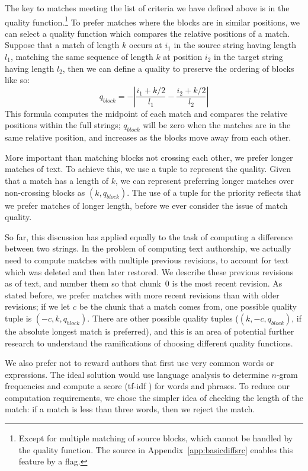 The key to matches meeting the list of criteria we have
defined above is in the quality function.\footnote{Except for
multiple matching of source blocks, which cannot be handled
by the quality
function.  The source in Appendix~\ref{app:basicdiffsrc}
enables this feature by a flag.}
To prefer matches where the blocks are in similar positions,
we can select a quality function which compares the relative
positions of a match.
Suppose that a match of length $k$ occurs at $i_1$ in the source
string having length $l_1$, matching the same sequence of length $k$ at
position $i_2$ in the target string having length $l_2$,
then we can define a quality to preserve the
ordering of blocks like so:
\begin{equation}
q_{block} = -\left| \frac{i_1 + k/2}{l_1} - \frac{i_2 + k/2}{l_2} \right|
\end{equation}
This formula computes the midpoint of each match and compares
the relative positions within the full strings; $q_{block}$ will be
zero when the matches are in the same relative position,
and increases as the blocks move away from each other.

More important than matching blocks not crossing each other,
we prefer longer matches of text.
To achieve this, we use a tuple to represent the quality.
Given that a match has a length of $k$, we can represent preferring
longer matches over non-crossing blocks as $(k, q_{block})$.
The use of a tuple for the priority reflects that we prefer
matches of longer length, before we ever consider the issue
of match quality.

So far, this discussion has applied equally to the task of
computing a difference between two strings.
In the problem of computing text authorship, we actually
need to compute matches with multiple previous revisions,
to account for text which was deleted and then later restored.
We describe these previous revisions as  of text,
and number them so that chunk~0 is the most recent revision.
As stated before, we prefer matches with more recent revisions
than with older
revisions; if we let $c$ be the chunk that a match comes from,
one possible quality tuple is $(-c, k, q_{block})$.
There are other possible quality tuples (\eg $(k, -c, q_{block})$,
if the absolute longest match is preferred), and this is
an area of potential further research to understand the ramifications
of choosing different quality functions.

We also prefer not to reward authors that first use very common words
or expressions.
The ideal solution would use language analysis to determine
$n$-gram frequencies and compute
a score (\eg tf-idf ) for words and phrases.
To reduce our computation requirements, we chose the simpler idea
of checking the length of the match: if a match is less than three
words, then we reject the match.

